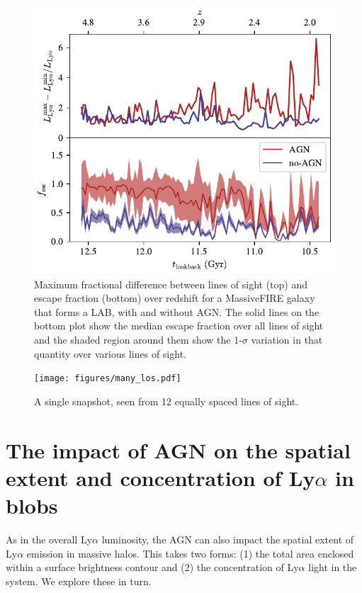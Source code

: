 \begin{figure}
    \centering
    \includegraphics[width=\textwidth,height=\textheight,keepaspectratio]{figures/agn_stats_by_los.pdf}
    \caption{
        Maximum fractional difference between lines of sight (top) and escape fraction (bottom) over redshift for a MassiveFIRE galaxy that forms a LAB, with and without AGN.
        The solid lines on the bottom plot show the median escape fraction over all lines of sight and the shaded region around them show the 1-$\sigma$ variation in that quantity over various lines of sight.
}
    \label{fig:f_esc}
\end{figure}

\begin{figure}
    \centering
    \texttt{[image: figures/many\_los.pdf]}
    \caption{
        A single snapshot, seen from 12 equally spaced lines of sight.
    }
    \label{fig:many_los}
\end{figure}


\section{The impact of AGN on the spatial extent and concentration of Ly\texorpdfstring{$\alpha$}{a} in blobs}

As in the overall Ly$\alpha$ luminosity, the AGN can also impact the spatial extent of Ly$\alpha$ emission in massive halos.
This takes two forms: (1) the total area enclosed within a surface brightness contour and (2) the concentration of Ly$\alpha$ light in the system.
We explore these in turn.

